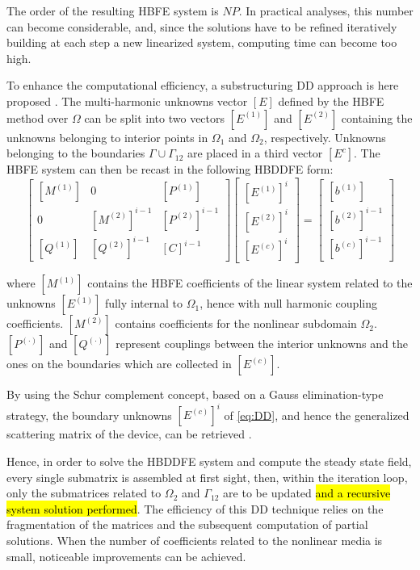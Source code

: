 \documentclass[journal]{IEEEtran}
\begin{document}
The order of the resulting HBFE system is $N P$. In practical analyses, this
number can become considerable, and, since the
solutions have to be refined iteratively building at each step a new linearized
system, computing time can become too high. 

To enhance the computational efficiency, a substructuring DD
approach is here proposed \cite{Saad2000, Toselli2005, Guarnieri2009,
Guarnieri2010}. The multi-harmonic unknowns vector $[E]$ defined by the HBFE method
over $\Omega$ can be split into two vectors $[E^{(1)}]$ and $[E^{(2)}]$
containing the unknowns belonging to interior points in $\Omega_1$ and
$\Omega_2$, respectively. Unknowns belonging to the boundaries
$\Gamma\cup\Gamma_{12}$ are placed in a third vector $[E^c]$. The HBFE system
can then be recast in the following HBDDFE form:
%
\begin{equation}\label{eq:DD}
\begin{bmatrix}
 [M^{(1)}] &  0  &  [P^{(1)}] \\
 0  &  [M^{(2)}]^{i-1} & [P^{(2)}]^{i-1} \\
 [Q^{(1)}] & [Q^{(2)}]^{i-1} & [C]^{i-1}
\end{bmatrix}
\!\!
\begin{bmatrix}
{[E^{(1)}]^{i}} \\
{[E^{(2)}]^{i}} \\
{[E^{(c)}]^{i}}
\end{bmatrix} 
\!\!=\!\!
\begin{bmatrix}
{[b^{(1)}]} \\
{[b^{(2)}]}^{i-1} \\
{[b^{(c)}]}^{i-1}
\end{bmatrix} 
\end{equation}

\noindent where $[M^{(1)}]$ contains the HBFE coefficients of the linear system
related to the unknowns $[E^{(1)}]$ fully internal to $\Omega_1$, hence with
null harmonic coupling coefficients. $[M^{(2)}]$ contains coefficients for the
nonlinear subdomain $\Omega_2$. ${[P^{(\cdot)}]}$ and ${[Q^{(\cdot)}]}$
represent couplings between the interior unknowns and the ones on the
boundaries which are collected in $[E^{(c)}]$. 

By using the Schur complement concept, based on a Gauss elimination-type
strategy, the boundary unknowns $[E^{(c)}]^{i}$ of \eqref{eq:DD}, and hence the
generalized scattering matrix of the device, can be retrieved 
\cite{Guarnieri2009, Guarnieri2010}.

Hence, in order to solve the HBDDFE system and compute the steady state field,
every single submatrix is assembled at first sight, then, within the iteration
loop, only the submatrices related to $\Omega_2$ and $\Gamma_{12}$ are to be
updated \hl{and a recursive system solution performed}. The efficiency of this 
DD technique relies on the fragmentation of the
matrices and the subsequent computation of partial solutions. When the number
of coefficients related to the nonlinear media is small, noticeable
improvements can be achieved.
\end{document}
